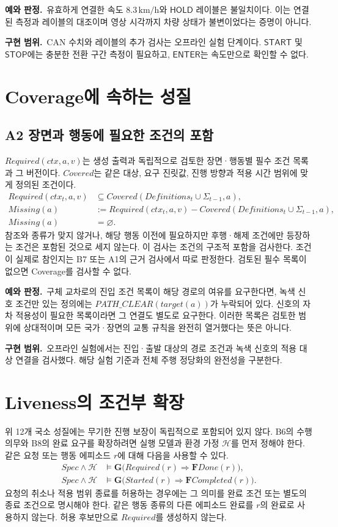 \documentclass[11pt,a4paper]{article}
\newcommand{\pred}[1]{\mathsf{#1}}
\newcommand{\G}{\mathbf{G}}
\newcommand{\F}{\mathbf{F}}
\newcommand{\example}{\par\textbf{예와 판정.}\ }
\newcommand{\impl}{\par\textbf{구현 범위.}\ }
\begin{document}
\example 유효하게 연결한 속도 $8.3\,\mathrm{km/h}$와
$\pred{HOLD}$ 레이블은 불일치이다.
이는 연결된 측정과 레이블의 대조이며 영상 시각까지 차량 상태가 불변이었다는 증명이 아니다.
\impl CAN 수치와 레이블의 추가 검사는 오프라인 실험 단계이다.
$\pred{START}$ 및 $\pred{STOP}$에는 충분한 전환 구간 측정이 필요하고,
$\pred{ENTER}$는 속도만으로 확인할 수 없다.

\section{Coverage에 속하는 성질}
\subsection{A2 장면과 행동에 필요한 조건의 포함}\label{prop:a2}
$Required(ctx,a,v)$는 생성 출력과 독립적으로 검토한
장면·행동별 필수 조건 목록과 그 버전이다.
$Covered$는 같은 대상, 요구 진릿값, 진행 방향과 적용 시간 범위에 맞게 정의된 조건이다.
\begin{align}
 Required(ctx_t,a,v)&\subseteq
 Covered(Definitions_t\cup\Sigma_{t-1},a),\label{eq:a2}\\
 Missing(a)&:=Required(ctx_t,a,v)-Covered(Definitions_t\cup\Sigma_{t-1},a),\\
 Missing(a)&=\varnothing.
\end{align}
참조와 종류가 맞지 않거나, 해당 행동 이전에 필요하지만 후행·해제 조건에만 등장하는 조건은 포함된 것으로 세지 않는다.
이 검사는 조건의 구조적 포함을 검사한다.
조건이 실제로 참인지는 B7 또는 A1의 근거 검사에서 따로 판정한다.
검토된 필수 목록이 없으면 Coverage를 검사할 수 없다.

\example 구체 교차로의 진입 조건 목록이 해당 경로의 여유를 요구한다면,
녹색 신호 조건만 있는 정의에는 $PATH\_CLEAR(target(a))$가 누락되어 있다.
신호의 자차 적용성이 필요한 목록이라면 그 연결도 별도로 요구한다.
이러한 목록은 검토한 범위에 상대적이며 모든 국가·장면의 교통 규칙을 완전히 열거했다는 뜻은 아니다.
\impl 오프라인 실험에서는 진입·출발 대상의 경로 조건과
녹색 신호의 적용 대상 연결을 검사했다.
해당 실험 기준과 전체 주행 정당화의 완전성을 구분한다.

\section{Liveness의 조건부 확장}\label{sec:liveness}
위 12개 국소 성질에는 무기한 진행 보장이 독립적으로 포함되어 있지 않다.
B6의 수행 의무와 B8의 완료 요구를 확장하려면
실행 모델과 환경 가정 $\mathcal{H}$를 먼저 정해야 한다.
같은 요청 또는 행동 에피소드 $r$에 대해 다음을 사용할 수 있다.
\begin{align}
 Spec\land\mathcal{H}&\models
 \G\bigl(Required(r)\Rightarrow\F Done(r)\bigr),\label{eq:liveb6}\\
 Spec\land\mathcal{H}&\models
 \G\bigl(Started(r)\Rightarrow\F Completed(r)\bigr).\label{eq:liveb8}
\end{align}
요청의 취소나 적용 범위 종료를 허용하는 경우에는
그 의미를 완료 조건 또는 별도의 종료 조건으로 명시해야 한다.
같은 행동 종류의 다른 에피소드 완료를 $r$의 완료로 사용하지 않는다.
허용 후보만으로 $Required$를 생성하지 않는다.
\end{document}
